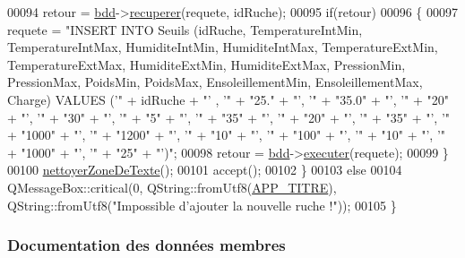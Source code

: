 \begin{DoxyCode}
00094         retour = \hyperlink{class_nouvelle_ruche_ihm_af552d9e6944c266060860d911878cff7}{bdd}->\hyperlink{class_base_de_donnees_a77539baad389f5acf754cd2cd452403e}{recuperer}(requete, idRuche);
00095         \textcolor{keywordflow}{if}(retour)
00096         \{
00097             requete = \textcolor{stringliteral}{"INSERT INTO Seuils (idRuche, TemperatureIntMin, TemperatureIntMax, HumiditeIntMin,
       HumiditeIntMax, TemperatureExtMin, TemperatureExtMax, HumiditeExtMin, HumiditeExtMax, PressionMin,
       PressionMax, PoidsMin, PoidsMax, EnsoleillementMin, EnsoleillementMax, Charge) VALUES ('"} + idRuche + \textcolor{stringliteral}{"' , '"} + \textcolor{stringliteral}{"25."} 
      + \textcolor{stringliteral}{"', '"} + \textcolor{stringliteral}{"35.0"} + \textcolor{stringliteral}{"', '"} + \textcolor{stringliteral}{"20"} + \textcolor{stringliteral}{"', '"} + \textcolor{stringliteral}{"30"} + \textcolor{stringliteral}{"', '"} + \textcolor{stringliteral}{"5"} + \textcolor{stringliteral}{"', '"} + \textcolor{stringliteral}{"35"} + \textcolor{stringliteral}{"', '"} + \textcolor{stringliteral}{"20"} + \textcolor{stringliteral}{"', '"} + \textcolor{stringliteral}{
      "35"} + \textcolor{stringliteral}{"', '"} + \textcolor{stringliteral}{"1000"} + \textcolor{stringliteral}{"', '"} + \textcolor{stringliteral}{"1200"} + \textcolor{stringliteral}{"', '"} + \textcolor{stringliteral}{"10"} + \textcolor{stringliteral}{"', '"} + \textcolor{stringliteral}{"100"} + \textcolor{stringliteral}{"', '"} + \textcolor{stringliteral}{"10"} + \textcolor{stringliteral}{"', '"} + \textcolor{stringliteral}{"1000"} 
      + \textcolor{stringliteral}{"', '"} + \textcolor{stringliteral}{"25"} + \textcolor{stringliteral}{"')"};
00098             retour = \hyperlink{class_nouvelle_ruche_ihm_af552d9e6944c266060860d911878cff7}{bdd}->\hyperlink{class_base_de_donnees_aa8de5f8f8bb17edc43f5c0ee33712081}{executer}(requete);
00099         \}
00100         \hyperlink{class_nouvelle_ruche_ihm_a09ddd61a2bd2b6779865e7d3b93ec2eb}{nettoyerZoneDeTexte}();
00101         accept();
00102     \}
00103     \textcolor{keywordflow}{else}
00104         QMessageBox::critical(0, QString::fromUtf8(\hyperlink{parametres_8h_ace364d1ce44aa9f79bcff6e3752c4a5f}{APP\_TITRE}), QString::fromUtf8(\textcolor{stringliteral}{"Impossible
       d'ajouter la nouvelle ruche !"}));
00105 \}
\end{DoxyCode}


\subsubsection{Documentation des données membres}
\mbox{\label{class_nouvelle_ruche_ihm_af552d9e6944c266060860d911878cff7}} 
